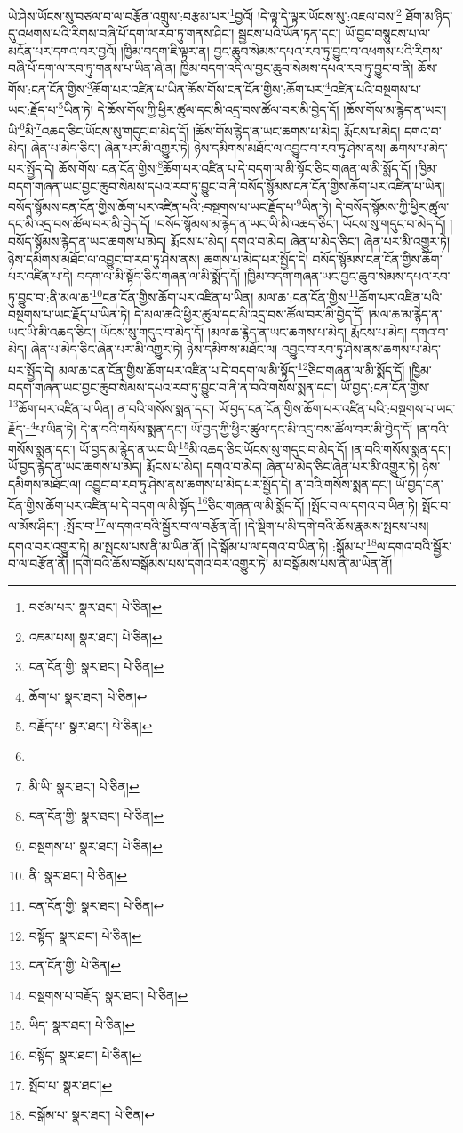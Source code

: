ཡེ་ཤེས་ཡོངས་སུ་བཙལ་བ་ལ་བརྩོན་འགྲུས་:བརྩམ་པར་\footnote{བཙམ་པར་  སྣར་ཐང་།  པེ་ཅིན། }བྱའོ། །དེ་ལྟ་དེ་ལྟར་ཡོངས་སུ་:འཇལ་བས།\footnote{འཇམ་པས།  སྣར་ཐང་།  པེ་ཅིན། } ཐོག་མ་ཉིད་དུ་འཕགས་པའི་རིགས་བཞི་པོ་དག་ལ་རབ་ཏུ་གནས་ཤིང་། སྦྱངས་པའི་ཡོན་ཏན་དང་། ཡོ་བྱད་བསྙུངས་པ་ལ་མངོན་པར་དགའ་བར་བྱའོ། །ཁྱིམ་བདག་ཇི་ལྟར་ན། བྱང་ཆུབ་སེམས་དཔའ་རབ་ཏུ་བྱུང་བ་འཕགས་པའི་རིགས་བཞི་པོ་དག་ལ་རབ་ཏུ་གནས་པ་ཡིན་ཞེ་ན། ཁྱིམ་བདག་འདི་ལ་བྱང་ཆུབ་སེམས་དཔའ་རབ་ཏུ་བྱུང་བ་ནི། ཆོས་གོས་:ངན་ངོན་གྱིས་\footnote{ངན་ངོན་གྱི་  སྣར་ཐང་།  པེ་ཅིན། }ཆོག་པར་འཛིན་པ་ཡིན་ཆོས་གོས་ངན་ངོན་གྱིས་:ཆོག་པར་\footnote{ཆོག་པ་  སྣར་ཐང་།  པེ་ཅིན། }འཛིན་པའི་བསྔགས་པ་ཡང་:རྗོད་པ་\footnote{བརྗོད་པ་  སྣར་ཐང་།  པེ་ཅིན། }ཡིན་ཏེ། དེ་ཆོས་གོས་ཀྱི་ཕྱིར་ཚུལ་དང་མི་འདྲ་བས་ཚོལ་བར་མི་བྱེད་དོ། །ཆོས་གོས་མ་རྙེད་ན་ཡང་། ཡི་\footnote{}མི་\footnote{མི་ཡི་  སྣར་ཐང་།  པེ་ཅིན། }འཆད་ཅིང་ཡོངས་སུ་གདུང་བ་མེད་དོ། །ཆོས་གོས་རྙེད་ན་ཡང་ཆགས་པ་མེད། རྨོངས་པ་མེད། དགའ་བ་མེད། ཞེན་པ་མེད་ཅིང་། ཞེན་པར་མི་འགྱུར་ཏེ། ཉེས་དམིགས་མཐོང་ལ་འབྱུང་བ་རབ་ཏུ་ཤེས་ནས། ཆགས་པ་མེད་པར་སྤྱོད་དེ། ཆོས་གོས་:ངན་ངོན་གྱིས་\footnote{ངན་ངོན་གྱི་  སྣར་ཐང་།  པེ་ཅིན། }ཆོག་པར་འཛིན་པ་དེ་བདག་ལ་མི་སྟོང་ཅིང་གཞན་ལ་མི་སྨོད་དོ། །ཁྱིམ་བདག་གཞན་ཡང་བྱང་ཆུབ་སེམས་དཔའ་རབ་ཏུ་བྱུང་བ་ནི་བསོད་སྙོམས་ངན་ངོན་གྱིས་ཆོག་པར་འཛིན་པ་ཡིན། བསོད་སྙོམས་ངན་ངོན་གྱིས་ཆོག་པར་འཛིན་པའི་:བསྔགས་པ་ཡང་རྗོད་པ་\footnote{བསྔགས་པ་  སྣར་ཐང་།  པེ་ཅིན། }ཡིན་ཏེ། དེ་བསོད་སྙོམས་ཀྱི་ཕྱིར་ཚུལ་དང་མི་འདྲ་བས་ཚོལ་བར་མི་བྱེད་དོ། །བསོད་སྙོམས་མ་རྙེད་ན་ཡང་ཡི་མི་འཆད་ཅིང་། ཡོངས་སུ་གདུང་བ་མེད་དོ། །བསོད་སྙོམས་རྙེད་ན་ཡང་ཆགས་པ་མེད། རྨོངས་པ་མེད། དགའ་བ་མེད། ཞེན་པ་མེད་ཅིང་། ཞེན་པར་མི་འགྱུར་ཏེ། ཉེས་དམིགས་མཐོང་ལ་འབྱུང་བ་རབ་ཏུ་ཤེས་ནས། ཆགས་པ་མེད་པར་སྤྱོད་དེ། བསོད་སྙོམས་ངན་ངོན་གྱིས་ཆོག་པར་འཛིན་པ་དེ། བདག་ལ་མི་སྟོད་ཅིང་གཞན་ལ་མི་སྨོད་དོ། །ཁྱིམ་བདག་གཞན་ཡང་བྱང་ཆུབ་སེམས་དཔའ་རབ་ཏུ་བྱུང་བ་:ནི་མལ་ཆ་\footnote{ནི་  སྣར་ཐང་།  པེ་ཅིན། }ངན་ངོན་གྱིས་ཆོག་པར་འཛིན་པ་ཡིན། མལ་ཆ་:ངན་ངོན་གྱིས་\footnote{ངན་ངོན་གྱི་  སྣར་ཐང་།  པེ་ཅིན། }ཆོག་པར་འཛིན་པའི་བསྔགས་པ་ཡང་རྗོད་པ་ཡིན་ཏེ། དེ་མལ་ཆའི་ཕྱིར་ཚུལ་དང་མི་འདྲ་བས་ཚོལ་བར་མི་བྱེད་དོ། །མལ་ཆ་མ་རྙེད་ན་ཡང་ཡི་མི་འཆད་ཅིང་། ཡོངས་སུ་གདུང་བ་མེད་དོ། །མལ་ཆ་རྙེད་ན་ཡང་ཆགས་པ་མེད། རྨོངས་པ་མེད། དགའ་བ་མེད། ཞེན་པ་མེད་ཅིང་ཞེན་པར་མི་འགྱུར་ཏེ། ཉེས་དམིགས་མཐོང་ལ། འབྱུང་བ་རབ་ཏུ་ཤེས་ནས་ཆགས་པ་མེད་པར་སྤྱོད་དེ། མལ་ཆ་ངན་ངོན་གྱིས་ཆོག་པར་འཛིན་པ་དེ་བདག་ལ་མི་སྟོད་\footnote{བསྟོད་  སྣར་ཐང་།  པེ་ཅིན། }ཅིང་གཞན་ལ་མི་སྨོད་དོ། །ཁྱིམ་བདག་གཞན་ཡང་བྱང་ཆུབ་སེམས་དཔའ་རབ་ཏུ་བྱུང་བ་ནི་ན་བའི་གསོས་སྨན་དང་། ཡོ་བྱད་:ངན་ངོན་གྱིས་\footnote{ངན་ངོན་གྱི་  པེ་ཅིན། }ཆོག་པར་འཛིན་པ་ཡིན། ན་བའི་གསོས་སྨན་དང་། ཡོ་བྱད་ངན་ངོན་གྱིས་ཆོག་པར་འཛིན་པའི་:བསྔགས་པ་ཡང་རྗོད་\footnote{བསྔགས་པ་བརྗོད་  སྣར་ཐང་།  པེ་ཅིན། }པ་ཡིན་ཏེ། དེ་ན་བའི་གསོས་སྨན་དང་། ཡོ་བྱད་ཀྱི་ཕྱིར་ཚུལ་དང་མི་འདྲ་བས་ཚོལ་བར་མི་བྱེད་དོ། །ན་བའི་གསོས་སྨན་དང་། ཡོ་བྱད་མ་རྙེད་ན་ཡང་ཡི་\footnote{ཡིད་  སྣར་ཐང་།  པེ་ཅིན། }མི་འཆད་ཅིང་ཡོངས་སུ་གདུང་བ་མེད་དོ། །ན་བའི་གསོས་སྨན་དང་། ཡོ་བྱད་རྙེད་ན་ཡང་ཆགས་པ་མེད། རྨོངས་པ་མེད། དགའ་བ་མེད། ཞེན་པ་མེད་ཅིང་ཞེན་པར་མི་འགྱུར་ཏེ། ཉེས་དམིགས་མཐོང་ལ། འབྱུང་བ་རབ་ཏུ་ཤེས་ནས་ཆགས་པ་མེད་པར་སྤྱོད་དེ། ན་བའི་གསོས་སྨན་དང་། ཡོ་བྱད་ངན་ངོན་གྱིས་ཆོག་པར་འཛིན་པ་དེ་བདག་ལ་མི་སྟོད་\footnote{བསྟོད་  སྣར་ཐང་།  པེ་ཅིན། }ཅིང་གཞན་ལ་མི་སྨོད་དོ། །སྤོང་བ་ལ་དགའ་བ་ཡིན་ཏེ། སྤོང་བ་ལ་མོས་ཤིང་། :སྤོང་བ་\footnote{སྤོབ་པ་  སྣར་ཐང་། }ལ་དགའ་བའི་སྦྱོར་བ་ལ་བརྩོན་ནོ། །དེ་སྡིག་པ་མི་དགེ་བའི་ཆོས་རྣམས་སྤངས་པས། དགའ་བར་འགྱུར་ཏེ། མ་སྤངས་པས་ནི་མ་ཡིན་ནོ། །དེ་སྒོམ་པ་ལ་དགའ་བ་ཡིན་ཏེ། :སྒོམ་པ་\footnote{བསྒོམ་པ་  སྣར་ཐང་།  པེ་ཅིན། }ལ་དགའ་བའི་སྦྱོར་བ་ལ་བརྩོན་ནོ། །དགེ་བའི་ཆོས་བསྒོམས་པས་དགའ་བར་འགྱུར་ཏེ། མ་བསྒོམས་པས་ནི་མ་ཡིན་ནོ། 